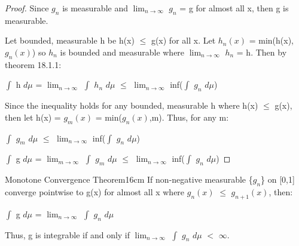     \begin{proof}
        Since $g_n$ is measurable and $\lim_{n \rightarrow \infty}$ $g_n$ = g
        for almost all x, then g is measurable.

        Let bounded, measurable h be h(x) $\leq$ g(x) for all x.
        Let $h_n(x)$ = min(h(x),$g_n(x)$) so $h_n$ is bounded and measurable
        where $\lim_{n \rightarrow \infty}$ $h_n$ = h.
        Then by {\color{red} theorem 18.1.1}:

        \hspace{0.5cm}
        $\int$ h $d\mu$
        = $\lim_{n \rightarrow \infty}$ $\int$ $h_n$ $d\mu$
        $\leq$ $\lim_{n \rightarrow \infty}$ inf($\int$ $g_n$ $d\mu$)

        Since the inequality holds for any bounded, measurable h
        where h(x) $\leq$ g(x), then let h(x) = $g_m(x)$ = min($g_n(x)$,m).
        Thus, for any m:

        \hspace{0.5cm}
        $\int$ $g_m$ $d\mu$
        $\leq$ $\lim_{n \rightarrow \infty}$ inf($\int$ $g_n$ $d\mu$)

        \hspace{0.5cm}
        $\int$ g $d\mu$
        = $\lim_{m \rightarrow \infty}$ $\int$ $g_m$ $d\mu$
        $\leq$ $\lim_{n \rightarrow \infty}$ inf($\int$ $g_n$ $d\mu$)
    \end{proof}

    \vspace{0.5cm}



    \begin{wtheorem}{Monotone Convergence Theorem}{16cm}
        If non-negative measurable \{$g_n$\} on [0,1]
        converge pointwise to g(x) for almost all x where
        $g_n(x)$ $\leq$ $g_{n+1}(x)$, then:

        \hspace{0.5cm}
        $\int$ g $d\mu$ = $\lim_{n \rightarrow \infty}$ $\int$ $g_n$ $d\mu$

        Thus, g is integrable if and only if
        $\lim_{n \rightarrow \infty}$ $\int$ $g_n$ $d\mu$ $<$ $\infty$.
    \end{wtheorem}

